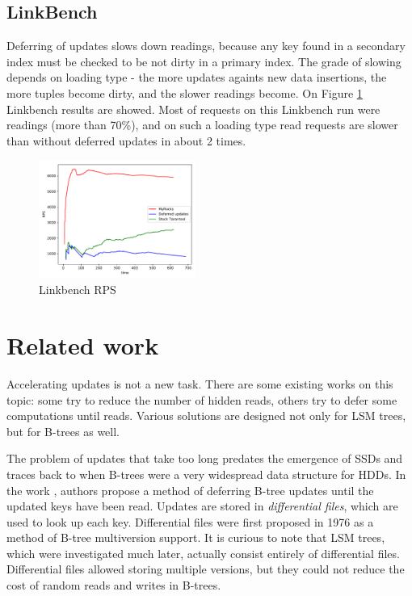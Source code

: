\documentclass{vldb}
\begin{document}
\subsection{LinkBench}

Deferring of updates slows down readings, because any key found in a secondary
index must be checked to be not dirty in a primary index. The grade of slowing
depends on loading type - the more updates againts new data insertions, the more
tuples become dirty, and the slower readings become. On Figure
\ref{fig:linkbench} Linkbench \cite{Armstrong:linkbench} results are showed.
Most of requests on this Linkbench run were readings (more than 70\%), and on
such a loading type read requests are slower than without deferred updates in
about 2 times.

\begin{figure}
\centering
\includegraphics[width=0.46\textwidth]{linkbench}
\caption{Linkbench RPS}
\label{fig:linkbench}
\end{figure}

\section{Related work}
Accelerating updates is not a new task. There are some existing works
on this topic: some try to reduce the number of hidden reads, others try to
defer some computations until reads. Various solutions are designed not only for
LSM trees, but for B-trees as well.

The problem of updates that take too long predates the emergence of SSDs
and traces back to when B-trees were a very widespread data structure for
HDDs. In the work \cite{Edward:incremental_update}, authors propose a
method of deferring B-tree updates until the updated keys have been read.
Updates are stored in \textit{differential files}, which are used to look up
each key. Differential files were first proposed in 1976 \cite{Lohman:differential_files}
as a method of B-tree multiversion support. It is curious to note that LSM trees,
which were investigated much later, actually consist entirely of differential files.
Differential files allowed storing multiple versions, but they could not reduce
the cost of random reads and writes in B-trees.
\end{document}
